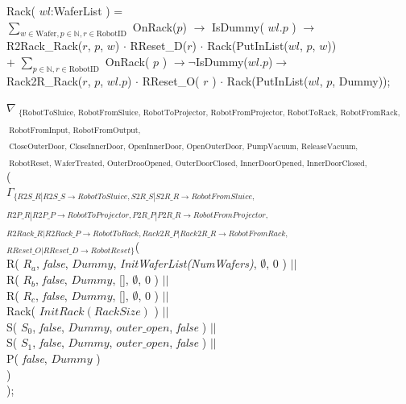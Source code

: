 \documentclass[12pt]{report}
\begin{document}
	{\small
	\phantom{---} Rack( $wl$:WaferList ) =\\
	\phantom{-------} $\sum\nolimits_{w\in \text{Wafer}, p \in \mathbb{N}, r \in \text{RobotID}}$ OnRack($p$) $\rightarrow$ IsDummy( $wl.p$ ) $\rightarrow$\\
	\phantom{-----------} R2Rack\_Rack($r$, $p$, $w$) $\cdot$ RReset\_D($r$) $\cdot$ Rack(PutInList($wl$, $p$, $w$))\\
	\phantom{-------} + $\sum\nolimits_{p \in \mathbb{N}, r \in \text{RobotID}}$ OnRack( $p$ ) $\rightarrow \neg$IsDummy($wl.p$)$\rightarrow$\\
	\phantom{-----------} Rack2R\_Rack($r$, $p$, $wl.p$) $\cdot$ RReset\_O( $r$ ) $\cdot$ Rack(PutInList($wl$, $p$, Dummy));
	}
	
	$\nabla_{\text{ \{RobotToSluice, RobotFromSluice, RobotToProjector, RobotFromProjector, RobotToRack, RobotFromRack,}}$\\
	\phantom{--} $_{ \text{ RobotFromInput, RobotFromOutput,}}$\\
	\phantom{--} $_{ \text{ CloseOuterDoor, CloseInnerDoor, OpenInnerDoor, OpenOuterDoor, PumpVacuum, ReleaseVacuum,}}$\\
	\phantom{--} $_{ \text{ RobotReset, WaferTreated, OuterDrooOpened, OuterDoorClosed, InnerDoorOpened, InnerDoorClosed, VacuumDone, VacuumReleased\}}}$(\\
	\phantom{---} $\Gamma_{\{R2S\_R|R2S\_S\rightarrow RobotToSluice,S2R\_S|S2R\_R\rightarrow RobotFromSluice,}$\\
	\phantom{-----} $_{ R2P\_R|R2P\_P\rightarrow RobotToProjector, P2R\_P|P2R\_R\rightarrow RobotFromProjector,}$\\
	\phantom{-----} $_{ R2Rack\_R|R2Rack\_P\rightarrow RobotToRack, Rack2R\_P|Rack2R\_R\rightarrow RobotFromRack,}$\\
	\phantom{-----} $_{ RReset\_O|RReset\_D\rightarrow RobotReset \}}$(\\
	\phantom{---------} R( $R_a$, \emph{false}, $Dummy$, \emph{InitWaferList(NumWafers)}, $\emptyset$, 0 ) $||$\\
	\phantom{---------} R( $R_b$, \emph{false}, $Dummy$, [], $\emptyset$, 0 ) $||$\\
	\phantom{---------} R( $R_c$, \emph{false}, $Dummy$, [], $\emptyset$, 0 ) $||$\\
	\phantom{---------} Rack( $InitRack(RackSize)$ ) $||$\\
	\phantom{---------} S( $S_0$, \emph{false}, $Dummy$, $outer\_open$, \emph{false} ) $||$\\
	\phantom{---------} S( $S_1$, \emph{false}, $Dummy$, $outer\_open$, \emph{false} ) $||$\\
	\phantom{---------} P( \emph{false}, $Dummy$ )\\
	\phantom{---} )\\
	);
	
\end{document}
